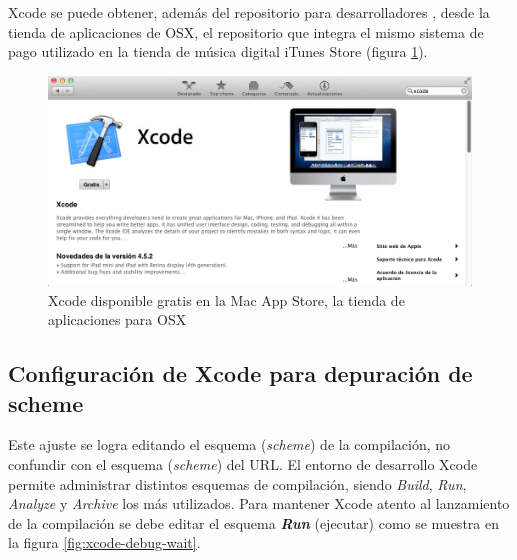 Xcode se puede obtener, además del repositorio para desarrolladores \cite{apple-repositorio}, desde la tienda de aplicaciones de OSX, el repositorio que integra el mismo sistema de pago utilizado en la tienda de música digital iTunes Store (figura \ref{fig:xcode-appstore}).
\begin{figure}[H]
	\centering
	\includegraphics[scale=0.4]{imgs/xcode-appstore.png} 
	\caption{Xcode disponible gratis en la Mac App Store, la tienda de aplicaciones para OSX}
	\label{fig:xcode-appstore}
\end{figure}  

		\subsection{Configuración de Xcode para depuración de scheme}
		\label{anexo:xcode-debug}
		Este ajuste se logra editando el esquema (\textit{scheme}) de la compilación, no confundir con el esquema (\textit{scheme}) del URL. El entorno de desarrollo Xcode permite administrar distintos esquemas de compilación, siendo \textit{Build}, \textit{Run}, \textit{Analyze} y \textit{Archive} los más utilizados. Para mantener Xcode atento al lanzamiento de la compilación se debe editar el esquema \textbf{\textit{Run}} (ejecutar) como se muestra en la figura \ref{fig:xcode-debug-wait}.
  
    
